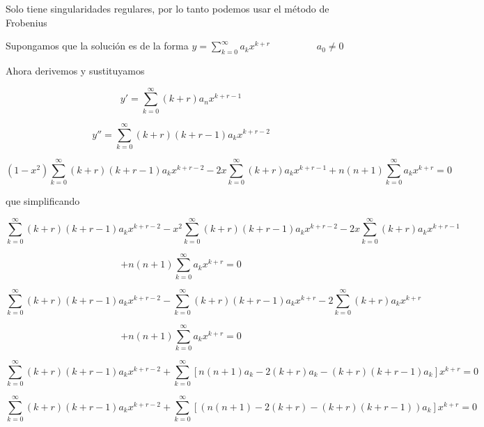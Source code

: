 \documentclass[12pt,a4paper]{article}
\begin{document}
\begin{enumerate}
    Solo tiene singularidades regulares, por lo tanto podemos usar el método de Frobenius
    
    Supongamos que la solución es de la forma   $y = \sum_{k= 0}^{\infty} a_k x^{k+r} \hspace{2cm} a_0 \neq 0$
    
    Ahora derivemos y sustituyamos 
    
    \begin{equation*}
        y' = \sum_{k=0}^{\infty} (k+r)a_nx^{k+r-1}
    \end{equation*}
    
    \begin{equation*}
        y'' = \sum_{k=0}^{\infty} (k+r)(k+r-1)a_kx^{k+r-2}
    \end{equation*}
    
    \begin{equation*}
        (1 - x^2) \sum_{k=0}^{\infty} (k+r)(k+r-1)a_kx^{k+r-2} - 2x\sum_{k=0}^{\infty} (k+r)a_kx^{k+r-1} + n(n+1)\sum_{k= 0}^{\infty} a_k x^{k+r} = 0
    \end{equation*}
    
    que simplificando 
    
    \begin{equation*}
        \sum_{k=0}^{\infty} (k+r)(k+r-1)a_kx^{k+r-2}- x^2 \sum_{k=0}^{\infty} (k+r)(k+r-1)a_kx^{k+r-2} - 2x\sum_{k=0}^{\infty} (k+r)a_kx^{k+r-1}
    \end{equation*}
    
    \begin{equation*}
         + n(n+1)\sum_{k= 0}^{\infty} a_k x^{k+r} = 0
    \end{equation*}
    
    \begin{equation*}
        \sum_{k=0}^{\infty} (k+r)(k+r-1)a_kx^{k+r-2}-\sum_{k=0}^{\infty} (k+r)(k+r-1)a_kx^{k+r} - 2\sum_{k=0}^{\infty} (k+r)a_kx^{k+r}
    \end{equation*}
    
    \begin{equation*}
         + n(n+1)\sum_{k= 0}^{\infty} a_k x^{k+r} = 0
    \end{equation*}
    
    \begin{equation*}
        \sum_{k=0}^{\infty} (k+r)(k+r-1)a_kx^{k+r-2}+\sum_{k=0}^{\infty}[ n(n+1)a_k-2(k+r)a_k-(k+r)(k+r-1)a_k]x^{k+r}= 0
    \end{equation*}
    
    \begin{equation*}
        \sum_{k=0}^{\infty} (k+r)(k+r-1)a_kx^{k+r-2}+\sum_{k=0}^{\infty}[ (n(n+1)-2(k+r)-(k+r)(k+r-1))a_k]x^{k+r}= 0
    \end{equation*}
    

\end{enumerate}
\end{document}
